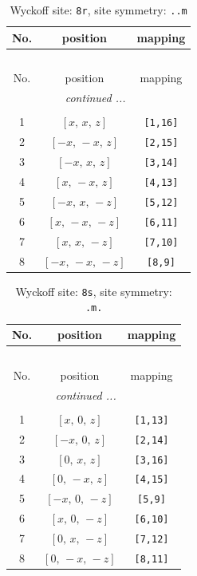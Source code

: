 \documentclass[fleqn,8pt]{jsarticle}
\begin{document}
\begin{longtable}{ccc}
\caption{Wyckoff site: {\tt 8r}, site symmetry: {\tt ..m}}
 \\
 \hline \hline
No. & position & mapping \\ \hline \endfirsthead

\multicolumn{2}{l}{\tablename\ \thetable{}} \\
 \hline \hline
No. & position & mapping \\ \hline \endhead

 \hline \hline
\multicolumn{2}{r}{\footnotesize\it continued ...} \\ \endfoot

 \hline \hline
\multicolumn{2}{r}{} \\ \endlastfoot

1 & $\left[ x,\, x,\, z \right]$ & {\tt [1,16]} \\ \hline
2 & $\left[ - x,\, - x,\, z \right]$ & {\tt [2,15]} \\ \hline
3 & $\left[ - x,\, x,\, z \right]$ & {\tt [3,14]} \\ \hline
4 & $\left[ x,\, - x,\, z \right]$ & {\tt [4,13]} \\ \hline
5 & $\left[ - x,\, x,\, - z \right]$ & {\tt [5,12]} \\ \hline
6 & $\left[ x,\, - x,\, - z \right]$ & {\tt [6,11]} \\ \hline
7 & $\left[ x,\, x,\, - z \right]$ & {\tt [7,10]} \\ \hline
8 & $\left[ - x,\, - x,\, - z \right]$ & {\tt [8,9]} \\
\end{longtable}
\renewcommand{\arraystretch}{1.2}
\begin{longtable}{ccc}
\caption{Wyckoff site: {\tt 8s}, site symmetry: {\tt .m.}}
 \\
 \hline \hline
No. & position & mapping \\ \hline \endfirsthead

\multicolumn{2}{l}{\tablename\ \thetable{}} \\
 \hline \hline
No. & position & mapping \\ \hline \endhead

 \hline \hline
\multicolumn{2}{r}{\footnotesize\it continued ...} \\ \endfoot

 \hline \hline
\multicolumn{2}{r}{} \\ \endlastfoot

1 & $\left[ x,\, 0,\, z \right]$ & {\tt [1,13]} \\ \hline
2 & $\left[ - x,\, 0,\, z \right]$ & {\tt [2,14]} \\ \hline
3 & $\left[ 0,\, x,\, z \right]$ & {\tt [3,16]} \\ \hline
4 & $\left[ 0,\, - x,\, z \right]$ & {\tt [4,15]} \\ \hline
5 & $\left[ - x,\, 0,\, - z \right]$ & {\tt [5,9]} \\ \hline
6 & $\left[ x,\, 0,\, - z \right]$ & {\tt [6,10]} \\ \hline
7 & $\left[ 0,\, x,\, - z \right]$ & {\tt [7,12]} \\ \hline
8 & $\left[ 0,\, - x,\, - z \right]$ & {\tt [8,11]} \\
\end{longtable}
\end{document}
